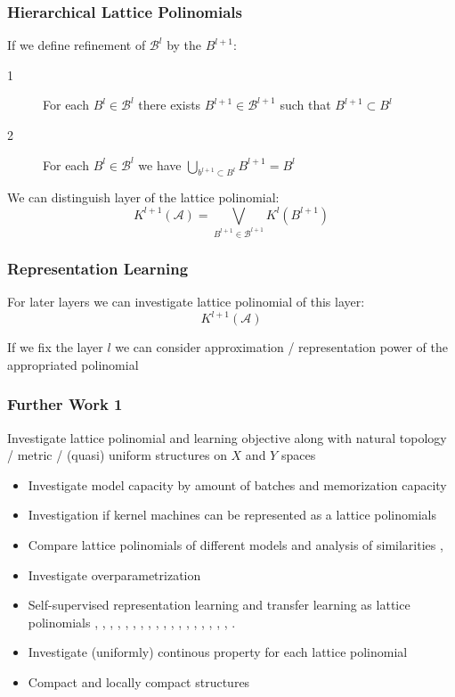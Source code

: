 \documentclass{beamer}
\newcommand {\A}                          {\mathcal{A}}
\newcommand {\B}                          {\mathcal{B}}
\begin{document}
\begin{frame}
    \frametitle{Hierarchical Lattice Polinomials}
        If we define refinement of $\B^{l}$ by the $B^{l+1}$:
        \begin{description}
            \item[1] For each $B^{l} \in \B^{l}$ there exists $B^{l + 1} \in \B^{l + 1}$
            such that $B^{l + 1} \subset B^{l}$
            \item[2] For each $B^{l} \in \B^{l} $ we have 
            $\bigcup_{b^{l + 1} \subset B^{l}}{B^{l + 1}} = B^{l}$
        \end{description}

        We can distinguish layer of the lattice polinomial:
        $$
        K^{l + 1}(\A) = \bigvee_{B^{l+1} \in \B^{l+1}}K^l(B^{l+1})
        $$
\end{frame}

\begin{frame}
    \frametitle{Representation Learning}
    For later layers we can investigate lattice polinomial of this layer:
    $$
    K^{l + 1}(\A)
    $$

    If we fix the layer $l$ we can consider approximation / representation power
    of the appropriated polinomial
\end{frame}

\begin{frame}
    \frametitle{Further Work 1}
    Investigate lattice polinomial and learning objective 
    along with natural topology / metric / (quasi) uniform structures 
    on $X$ and $Y$ spaces
    \begin{itemize}
        \item Investigate model capacity by amount of batches 
        and memorization capacity \cite{RandLabs} 
        \item Investigation if kernel machines can be represented as a lattice polinomials
        \item Compare lattice polinomials of different models and analysis of similarities
        \cite{NNKernalMach}, \cite{NNKerLearn}
        \item Investigate overparametrization \cite{NNOverparam}
        \item Self-supervised representation learning and transfer learning 
        as lattice polinomials \cite{PerSal}, \cite{PanYang}, \cite{FurZhan}, \cite{ChenKorbin},
        \cite{HeWe}, \cite{OordLi}, \cite{GrillFlor}, \cite{DevlChang}, \cite{LiuOtt},
        \cite{VelicFedus}, \cite{GroverLesk}, \cite{KipfWell}, \cite{ZhuXu}, \cite{LiuZhang}, 
        \cite{JaisBabu}, \cite{XieXu}, \cite{WuLin}, \cite{YouChen}, \cite{ThakCor}.
        \item Investigate (uniformly) continous property for each lattice polinomial
        \item Compact and locally compact structures
    \end{itemize}
\end{frame}
\end{document}
